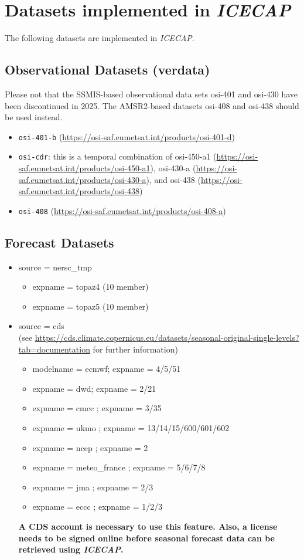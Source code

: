 \documentclass[DIV=10, parskip=full]{scrreprt}
\newcommand{\ice}{\textit{ICECAP}\xspace}
\begin{document}
\section{Datasets implemented in \ice} \label{chap:data}
The following datasets are implemented in \ice.

\subsection{Observational Datasets (verdata)}

Please not that the SSMIS-based observational data sets osi-401 and osi-430 have been discontinued in 2025. The AMSR2-based datasets osi-408 and osi-438 should be used instead.
\begin{itemize}
	\item \texttt{osi-401-b} (\url{https://osi-saf.eumetsat.int/products/osi-401-d})
	\item \texttt{osi-cdr}: this is a temporal combination of osi-450-a1 (\url{https://osi-saf.eumetsat.int/products/osi-450-a1}), osi-430-a (\url{https://osi-saf.eumetsat.int/products/osi-430-a}), and osi-438 (\url{https://osi-saf.eumetsat.int/products/osi-438})
	\item \texttt{osi-408} (\url{https://osi-saf.eumetsat.int/products/osi-408-a})
\end{itemize}
	
\subsection{Forecast Datasets}
\begin{itemize}
	\item source = nersc\_tmp
	\begin{itemize}
		\item expname = topaz4 (10 member)
		\item expname = topaz5 (10 member)
	\end{itemize}
	\item source = cds \\
	(see \url{https://cds.climate.copernicus.eu/datasets/seasonal-original-single-levels?tab=documentation} for further information)
	\begin{itemize}
		\item modelname = ecmwf; expname = 4/5/51
		\item expname = dwd; expname = 2/21
		\item expname = cmcc ; expname = 3/35
		\item expname = ukmo ; expname = 13/14/15/600/601/602
		\item expname = ncep ; expname = 2
		\item expname = meteo\_france ; expname = 5/6/7/8
		\item expname = jma ; expname = 2/3
		\item expname = eccc ; expname = 1/2/3
	\end{itemize}
	\textbf{A CDS account is necessary to use this feature. Also, a license needs to be signed online before seasonal forecast data can be retrieved using \ice.}
\end{itemize}
\end{document}
